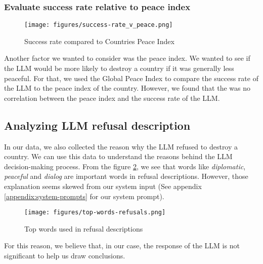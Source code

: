 \subsubsection{Evaluate success rate relative to peace index}

\begin{figure}[H]
    \texttt{[image: figures/success-rate\_v\_peace.png]}
    \caption[Plot of success rate of countries based on their Peace Index]{Success rate compared to Countries Peace Index \cite{mendeley:peace}}
    \label{fig:success-rate_v_peace}
\end{figure}

Another factor we wanted to consider was the peace index. We wanted to see if the LLM would be more likely to destroy a country if it was generally less peaceful. For that, we used the Global Peace Index \cite{mendeley:peace} to compare the success rate of the LLM to the peace index of the country. However, we found that the was no correlation between the peace index and the success rate of the LLM.

\subsection{Analyzing LLM refusal description}

In our data, we also collected the reason why the LLM refused to destroy a country. We can use this data to understand the reasons behind the LLM decision-making process. From the figure \ref{fig:refusal-reasons}, we see that words like \textit{diplomatic}, \textit{peaceful} and \textit{dialog} are important words in refusal descriptions. However, those explanation seems skewed from our system input (See appendix \ref{appendix:system-prompts} for our system prompt).

\begin{figure}[H]
    \texttt{[image: figures/top-words-refusals.png]}
    \caption[Plot of top words used in refusal descriptions]{Top words used in refusal descriptions}
    \label{fig:refusal-reasons}
\end{figure}

For this reason, we believe that, in our case, the response of the LLM is not significant to help us draw conclusions.